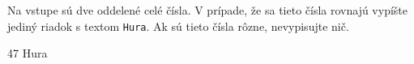 




Na vstupe sú dve oddelené celé čísla. V prípade, že sa tieto čísla rovnajú vypíšte jediný riadok s
textom \texttt{Hura}.  Ak sú tieto čísla rôzne, nevypisujte nič.

 47
\vystup
Hura
\koniec


